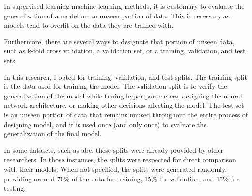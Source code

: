 
In supervised learning machine learning methods, it is
customary to evaluate the generalization of a model on an
unseen portion of data. This is necessary as models tend to
\gls{overfit} on the data they are trained with.

Furthermore, there are several ways to designate that
portion of unseen data, such as k-fold cross validation, a
validation set, or a training, validation, and test sets. 

In this research, I opted for training, validation, and test
splits. The training split is the data used for training the
model. The validation split is to verify the generalization
of the model while tuning hyper-parameters, designing the
neural network architecture, or making other decisions
affecting the model. The test set is an unseen portion of
data that remains unused throughout the entire process of
designing model, and it is used once (and only once) to
evaluate the generalization of the final model.

In some datasets, such as \gls{abc}, these splits were
already provided by other researchers. In those instances,
the splits were respected for direct comparison with their
models. When not specified, the splits were generated
randomly, providing around 70\% of the data for training,
15\% for validation, and 15\% for testing.